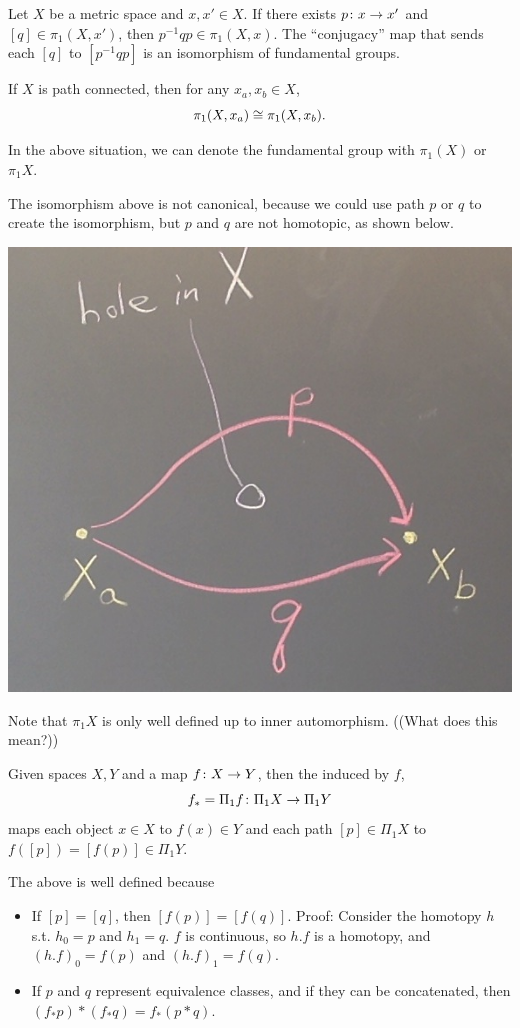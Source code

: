 \documentclass[11pt,leqno,oneside]{amsart}
\numberwithin{thm}{section}
\newcommand{\fund}[1][1]{\pi_{#1}}
\begin{document}
\begin{thm}[Hatcher 1.5]
  Let $X$ be a metric space and $x,x' \in X$.  If there exists
  $p\colon x \to x'$ and $[q] \in \fund(X,x')$, then
  $p^{-1}qp \in \fund(X,x)$.  The ``conjugacy'' map that sends each $[q]$ to $[p^{-1}qp]$ is an isomorphism of fundamental groups.
\end{thm}
\begin{thm}
  If $X$ is path connected, then for any $x_a, x_b \in X$,
  $$\fund(X, x_a) \isom \fund(X, x_b).$$
\end{thm}
In the above situation, we can denote the fundamental
group with $\fund(X)$ or $\fund X$.
\begin{example}
  The isomorphism above is not canonical, because we could use path $p$ or $q$ to create the isomorphism, but $p$ and $q$ are not homotopic, as shown below.

  \includegraphics[scale=0.2]{images/isomorphism-not-canonical}

  Note that $\fund X$ is only well defined up to inner automorphism.  ((What does this mean?))
\end{example}
\begin{defn}
  Given spaces $X, Y$ and a map $f\colon X \to Y$, then the
   induced by $f$,
  $$f_* = \Pi_1 f \colon \Pi_1 X \to \Pi_1 Y$$ maps each object $x \in X$
  to $f(x) \in Y$ and each path $[p] \in \Pi_1 X$ to
  $f([p]) = [f(p)] \in \Pi_1 Y$.
\end{defn}
\begin{prop}
  The above is well defined because
  \begin{itemize}
  \item If $[p]=[q]$, then $[f(p)] = [f(q)]$.  Proof:  Consider the homotopy $h$ s.t. $h_0 = p$ and $h_1 = q$.  $f$ is continuous, so $h.f$ is a homotopy, and $(h.f)_0 = f(p)$ and $(h.f)_1 = f(q)$.
  \item If $p$ and $q$ represent equivalence classes, and if they can be concatenated, then $(f_*p)*(f_*q) = f_*(p*q)$.
  \end{itemize}
\end{prop}
\end{document}

